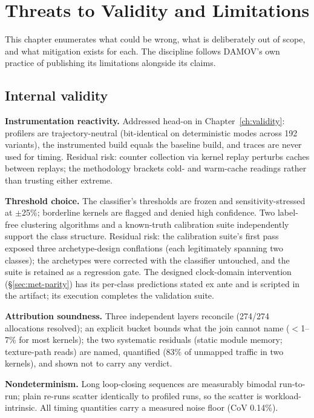 \chapter{Threats to Validity and Limitations}
\label{ch:threats}

This chapter enumerates what could be wrong, what is deliberately out of
scope, and what mitigation exists for each. The discipline follows DAMOV's
own practice of publishing its limitations alongside its claims.

\section{Internal validity}

\textbf{Instrumentation reactivity.} Addressed head-on in
Chapter~\ref{ch:validity}: profilers are trajectory-neutral (bit-identical
on deterministic modes across 192 variants), the instrumented build equals
the baseline build, and traces are never used for timing. Residual risk:
counter collection via kernel replay perturbs caches between replays; the
methodology brackets cold- and warm-cache readings rather than trusting
either extreme.

\textbf{Threshold choice.} The classifier's thresholds are frozen and
sensitivity-stressed at $\pm$25\%; borderline kernels are flagged and denied
high confidence. Two label-free clustering algorithms and a known-truth
calibration suite independently support the class structure. Residual risk:
the calibration suite's first pass exposed three archetype-design conflations
(each legitimately spanning two classes); the archetypes were corrected with
the classifier untouched, and the suite is retained as a regression gate.
The designed clock-domain intervention (\S\ref{sec:met-parity}) has its
per-class predictions stated ex ante and is scripted in the artifact; its
execution completes the validation suite.

\textbf{Attribution soundness.} Three independent layers reconcile
(274/274 allocations resolved); an explicit  bucket bounds
what the join cannot name ($<$1--7\% for most kernels); the two systematic
residuals (static module memory; texture-path reads) are named, quantified
(83\% of unmapped traffic in two kernels), and shown not to carry any
verdict.

\textbf{Nondeterminism.} Long loop-closing sequences are measurably bimodal
run-to-run; plain re-runs scatter identically to profiled runs, so the
scatter is workload-intrinsic. All timing quantities carry a measured noise
floor (CoV 0.14\%).

